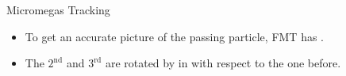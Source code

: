 \begin{frame}{Micromegas Tracking}
    \label{20.08::fmt_geometry}

    \begin{itemize}
        \item
            To get an accurate picture of the passing particle, FMT has .

        \item
            The $2^\text{nd}$ and $3^\text{rd}$ are rotated by  in  with respect to the one before.
    \end{itemize}

    \vspace{12pt}
    \begin{center}
    \end{center}

\end{frame}
